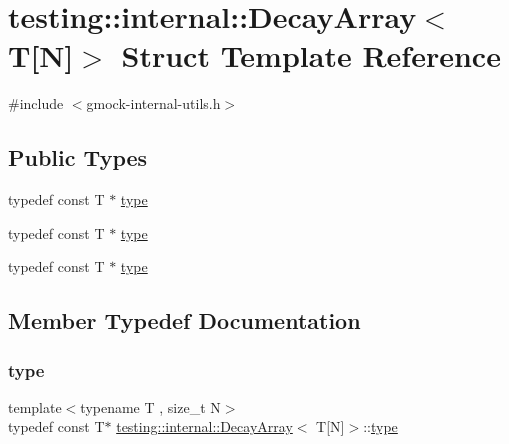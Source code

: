 \hypertarget{structtesting_1_1internal_1_1_decay_array_3_01_t[_n]_4}{}\section{testing\+::internal\+::Decay\+Array$<$ T\mbox{[}N\mbox{]}$>$ Struct Template Reference}
\label{structtesting_1_1internal_1_1_decay_array_3_01_t[_n]_4}


{\ttfamily \#include $<$gmock-\/internal-\/utils.\+h$>$}

\subsection*{Public Types}
\begin{DoxyCompactItemize}
\item 
typedef const T $\ast$ \mbox{\hyperlink{structtesting_1_1internal_1_1_decay_array_3_01_t[_n]_4_afc22a88da484b94639501c07fb90bfd3}{type}}
\item 
typedef const T $\ast$ \mbox{\hyperlink{structtesting_1_1internal_1_1_decay_array_3_01_t[_n]_4_afc22a88da484b94639501c07fb90bfd3}{type}}
\item 
typedef const T $\ast$ \mbox{\hyperlink{structtesting_1_1internal_1_1_decay_array_3_01_t[_n]_4_afc22a88da484b94639501c07fb90bfd3}{type}}
\end{DoxyCompactItemize}


\subsection{Member Typedef Documentation}
\mbox{\label{structtesting_1_1internal_1_1_decay_array_3_01_t[_n]_4_afc22a88da484b94639501c07fb90bfd3}} 
\subsubsection{\texorpdfstring{type}{type}\hspace{0.1cm}{\footnotesize\ttfamily [1/3]}}
{\footnotesize\ttfamily template$<$typename T , size\+\_\+t N$>$ \\
typedef const T$\ast$ \mbox{\hyperlink{structtesting_1_1internal_1_1_decay_array}{testing\+::internal\+::\+Decay\+Array}}$<$ T\mbox{[}N\mbox{]}$>$\+::\mbox{\hyperlink{structtesting_1_1internal_1_1_decay_array_3_01_t[_n]_4_afc22a88da484b94639501c07fb90bfd3}{type}}}

